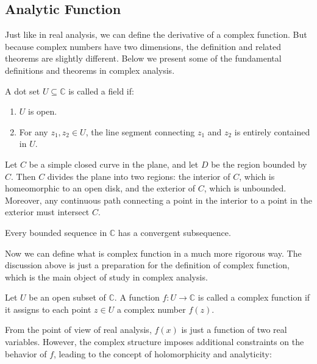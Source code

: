 \subsection{Analytic Function}

Just like in real analysis, we can define the derivative of a complex function. But because complex numbers have two dimensions, the definition and related theorems are slightly different. Below we present some of the fundamental definitions and theorems in complex analysis.

\begin{definition}
    A dot set $U \subseteq \mathbb{C}$ is called a field if: 
    \begin{enumerate}
        \item $U$ is open.
        \item For any $z_1, z_2 \in U$, the line segment connecting $z_1$ and $z_2$ is entirely contained in $U$.
    \end{enumerate}
\end{definition}

\begin{theorem}
    Let $C$ be a simple closed curve in the plane, and let $D$ be the region bounded by $C$. Then $C$ divides the plane into two regions: the interior of $C$, which is homeomorphic to an open disk, and the exterior of $C$, which is unbounded. Moreover, any continuous path connecting a point in the interior to a point in the exterior must intersect $C$.
\end{theorem}

\begin{theorem}
    Every bounded sequence in $\mathbb{C}$ has a convergent subsequence.
\end{theorem}

Now we can define what is complex function in a much more rigorous way. The discussion above is just a preparation for the definition of complex function, which is the main object of study in complex analysis.

\begin{definition}
    Let $U$ be an open subset of $\mathbb{C}$. A function $f: U \to \mathbb{C}$ is called a complex function if it assigns to each point $z \in U$ a complex number $f(z)$.
\end{definition}

From the point of view of real analysis, $f(x)$ is just a function of two real variables. However, the complex structure imposes additional constraints on the behavior of $f$, leading to the concept of holomorphicity and analyticity:

